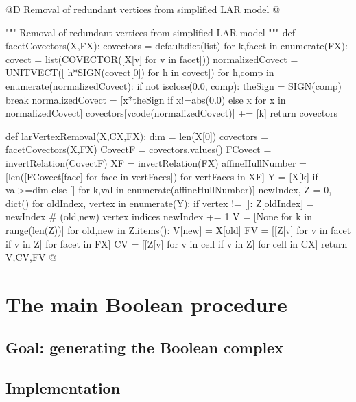 \documentclass[11pt,oneside]{article}	%
\begin{document}
@D Removal of redundant vertices from simplified LAR model
@{""" Removal of redundant vertices from simplified LAR model """
def facetCovectors(X,FX):
	covectors = defaultdict(list) 
	for k,facet in enumerate(FX):
		covect = list(COVECTOR([X[v] for v in facet]))
		normalizedCovect = UNITVECT([ h*SIGN(covect[0])  for h in covect])
		for h,comp in enumerate(normalizedCovect): 
			if not isclose(0.0, comp): 
				theSign = SIGN(comp)
				break
		normalizedCovect = [x*theSign  if x!=abs(0.0) else x for x in normalizedCovect]
		covectors[vcode(normalizedCovect)] += [k]
	return covectors

def larVertexRemoval(X,CX,FX):
	dim = len(X[0])
	covectors = facetCovectors(X,FX)
	CovectF = covectors.values()
	FCovect = invertRelation(CovectF)
	XF = invertRelation(FX)
	affineHullNumber = [len([FCovect[face] for face in vertFaces]) for vertFaces in XF]
	Y = [X[k] if val>=dim else [] for k,val in enumerate(affineHullNumber)]
	newIndex, Z = 0, dict()
	for oldIndex, vertex in enumerate(Y):
		if vertex != []:
			Z[oldIndex] = newIndex  # (old,new) vertex indices
			newIndex += 1
	V = [None for k in range(len(Z))]
	for old,new in Z.items():
		V[new] = X[old]
	FV = [[Z[v] for v in facet if v in Z] for facet in FX]
	CV = [[Z[v] for v in cell if v in Z] for cell in CX]
	return V,CV,FV
@}


\section{The main Boolean procedure}

\subsection{Goal: generating the Boolean complex}


\subsection{Implementation}
\end{document}
